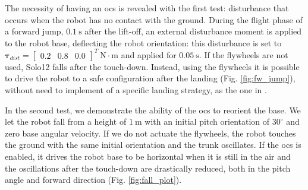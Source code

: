 \documentclass[sensors,article,submit,pdftex,moreauthors]{Definitions/mdpi}
\newcommand{\MF}[1]{\textcolor{red}{\textbf{mfocchi}: #1}}
\begin{document}
The necessity of having an \gls{ocs} is revealed with the first test: disturbance that occurs when the robot has no contact with the ground. 
During the flight phase of a forward jump, $0.1~\mathrm{s}$ after the lift-off, an external disturbance moment is applied to the robot base, deflecting the robot orientation: this disturbance is set to $\bm{\tau}_{dist} = \left[\begin{array}{ccc}
0.2 & 0.8 & 0.0
\end{array}
\right]^T \ \mathrm{N \cdot m}$ and applied for $0.05 \ \mathrm{s}$. 
If the flywheels are not used, Solo12 falls after the touch-down. Instead, 
using the flywheels %
it is possible to drive the robot to a safe configuration after the landing (Fig. \ref{fig:fw_jump}), without need to implement of a specific landing strategy, as the one in \cite{jeon2021real}.


In the second test, we demonstrate the ability of the \gls{ocs} to reorient the base.
We let the robot fall from a height of $1 \ \mathrm{m}$ with an initial pitch orientation of $30^\circ$ and zero base angular velocity.
If we do not actuate the flywheels, the robot touches the ground with the same initial orientation and the trunk oscillates. If the \gls{ocs} is enabled, it drives the robot base to be horizontal when it is still in the air and the oscillations after the touch-down are drastically reduced, both in the pitch angle and forward direction (Fig. \ref{fig:fall_plot}).
\end{document}
